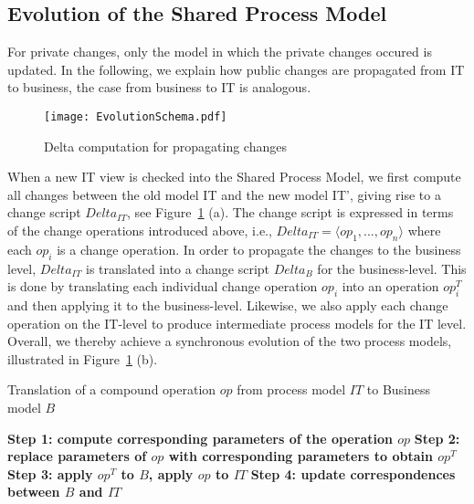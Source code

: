 \subsection{Evolution of the Shared Process Model}

For private changes, only the model in which the private changes occured is updated. In the following, we explain how public changes are propagated from IT to business, the case from business to IT is analogous. 
 
\begin{figure}[t]
\begin{center}
\texttt{[image: EvolutionSchema.pdf]} %
\caption{Delta computation for propagating changes}
\label{fig:Deltas}
\end{center}
\end{figure}


When a new IT view is checked into the Shared Process Model, we first compute all changes between the old model IT and the new model IT', giving rise to a change script $Delta_{IT}$, see Figure~\ref{fig:Deltas} (a). The change script is expressed in terms of the change operations introduced above, i.e., $Delta_{IT} = \langle op_1,...,op_n \rangle$ where each $op_i$ is a change operation. In order to propagate the changes to the business level, $Delta_{IT}$ is translated into a change script $Delta_B$ for the business-level.
This is done by translating each individual change operation $op_i$ into an operation $op_i^T$ and then applying it to the business-level. Likewise, we also apply each change operation on the IT-level to produce intermediate process models for the IT level. Overall, we thereby achieve a synchronous evolution of the two process models, illustrated in Figure~\ref{fig:Deltas} (b). 


\begin{algorithm}
{\small
\caption{Translation of a compound operation $op$ from process model $IT$ to Business model $B$}
\label{alg:translation}


\begin{algorithmic}
\STATE \textbf{Step 1: compute corresponding parameters of the operation $op$ }
\STATE \textbf{Step 2: replace parameters of $op$ with corresponding parameters to obtain $op^T$ }
\STATE \textbf{Step 3: apply $op^T$ to $B$, apply $op$ to $IT$}
\STATE \textbf{Step 4: update correspondences between $B$ and $IT$}
\end{algorithmic}
}
\end{algorithm}


